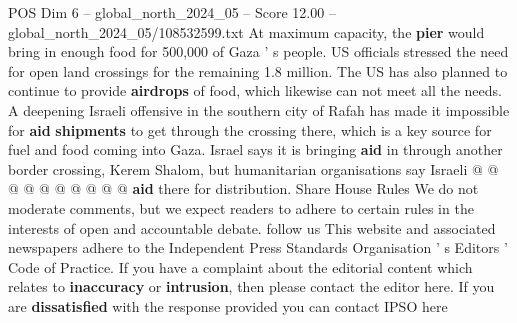 \begin{textsample}{POS Dim 6 – global\_north\_2024\_05 – Score 12.00 – global\_north\_2024\_05/108532599.txt}
At maximum capacity, the \textbf{pier} would bring in enough food for 500,000 of Gaza ' s people.
US officials stressed the need for open land crossings for the remaining 1.8 million.
The US has also planned to continue to provide \textbf{airdrops} of food, which likewise can not meet all the needs.
A deepening Israeli offensive in the southern city of Rafah has made it impossible for \textbf{aid} \textbf{shipments} to get through the crossing there, which is a key source for fuel and food coming into Gaza.
Israel says it is bringing \textbf{aid} in through another border crossing, Kerem Shalom, but humanitarian organisations say Israeli @ @ @ @ @ @ @ @ @ @ \textbf{aid} there for distribution.
Share House Rules We do not moderate comments, but we expect readers to adhere to certain rules in the interests of open and accountable debate. follow us This website and associated newspapers adhere to the Independent Press Standards Organisation ' s Editors ' Code of Practice.
If you have a complaint about the editorial content which relates to \textbf{inaccuracy} or \textbf{intrusion}, then please contact the editor here.
If you are \textbf{dissatisfied} with the response provided you can contact IPSO here

\end{textsample}

